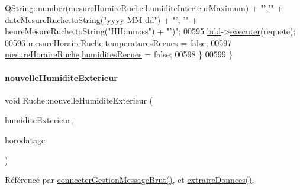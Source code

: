 \begin{DoxyCode}
      QString::number(\hyperlink{class_ruche_a9a68d3b7eb272e139f1532fdcbca2da3}{mesureHoraireRuche}.\hyperlink{struct_mesure_horaire_ruche_ac8733bd08c235de27dd3eea85749c3f6}{humiditeInterieurMaximum}) + \textcolor{stringliteral}{"','"} + 
      dateMesureRuche.toString(\textcolor{stringliteral}{"yyyy-MM-dd"}) + \textcolor{stringliteral}{"', '"} + heureMesureRuche.toString(\textcolor{stringliteral}{"HH:mm:ss"}) + \textcolor{stringliteral}{"')"};
00595         \hyperlink{class_ruche_a8577fdedabdecd98652e338e83bb3b65}{bdd}->\hyperlink{class_base_de_donnees_aa8de5f8f8bb17edc43f5c0ee33712081}{executer}(requete);
00596         \hyperlink{class_ruche_a9a68d3b7eb272e139f1532fdcbca2da3}{mesureHoraireRuche}.\hyperlink{struct_mesure_horaire_ruche_ade9984cb0f2c62b3ba1369f77249bb4a}{temperaturesRecues} = \textcolor{keyword}{false};
00597         \hyperlink{class_ruche_a9a68d3b7eb272e139f1532fdcbca2da3}{mesureHoraireRuche}.\hyperlink{struct_mesure_horaire_ruche_a4f825f05bf4e61db7b18a08dee759b7a}{humiditesRecues} = \textcolor{keyword}{false};
00598     \}
00599 \}
\end{DoxyCode}
\mbox{\label{class_ruche_af88c6ed0320bfe45d5b15faa936caf4d}} 
\paragraph{\texorpdfstring{nouvelle\+Humidite\+Exterieur}{nouvelleHumiditeExterieur}}
{\footnotesize\ttfamily void Ruche\+::nouvelle\+Humidite\+Exterieur (\begin{DoxyParamCaption}\item[{Q\+String}]{humidite\+Exterieur,  }\item[{Q\+String}]{horodatage }\end{DoxyParamCaption})\hspace{0.3cm}{\ttfamily [signal]}}



Référencé par \hyperlink{class_ruche_a9c8e7e3b529676c6dda3d936370af00f}{connecter\+Gestion\+Message\+Brut()}, et \hyperlink{class_ruche_a21c0dafeaec03d451590037343e6a3ca}{extraire\+Donnees()}.

\mbox{\label{class_ruche_a1d5094246e935d8ae5b9f08c9d042247}} 
